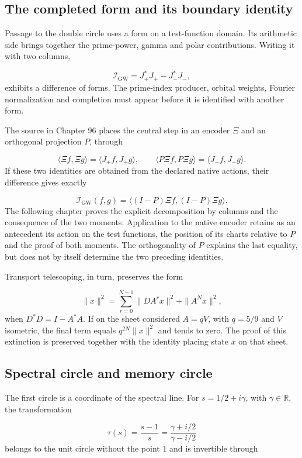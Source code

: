 \subsection{The completed form and its boundary identity}
Passage to the double circle uses a form on a test-function domain. Its arithmetic side brings together the prime-power, gamma and polar contributions. Writing it with two columns,

\[
\mathscr I_{\mathrm{GW}}=J_+^*J_+-J_-^*J_-,
\]
exhibits a difference of forms. The prime-index producer, orbital weights, Fourier normalization and completion must appear before it is identified with another form.

The source in Chapter 96 places the central step in an encoder $\Xi$ and an orthogonal projection $P$, through

\[
\langle\Xi f,\Xi g\rangle=\langle J_+f,J_+g\rangle,
\qquad
\langle P\Xi f,P\Xi g\rangle=\langle J_-f,J_-g\rangle.
\]
If these two identities are obtained from the declared native actions, their difference gives exactly

\[
\mathscr I_{\mathrm{GW}}(f,g)
=\langle(I-P)\Xi f,(I-P)\Xi g\rangle.
\]
The following chapter proves the explicit decomposition by columns and the consequence of the two moments. Application to the native encoder retains as an antecedent its action on the test functions, the position of its charts relative to $P$ and the proof of both moments. The orthogonality of $P$ explains the last equality, but does not by itself determine the two preceding identities.

Transport telescoping, in turn, preserves the form

\[
\|x\|^2=\sum_{r=0}^{N-1}\|DA^rx\|^2+\|A^Nx\|^2,
\]
when $D^*D=I-A^*A$. If on the sheet considered $A=qV$, with $q=5/9$ and $V$ isometric, the final term equals $q^{2N}\|x\|^2$ and tends to zero. The proof of this extinction is preserved together with the identity placing state $x$ on that sheet.

\subsection{Spectral circle and memory circle}
The first circle is a coordinate of the spectral line. For $s=1/2+i\gamma$, with \(\gamma\in\mathbb R\), the transformation

\[
\tau(s)=\frac{s-1}{s}
=\frac{\gamma+i/2}{\gamma-i/2}
\]
belongs to the unit circle without the point \(1\) and is invertible through

